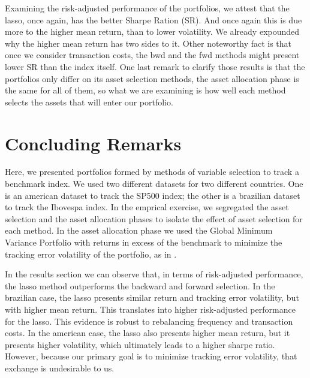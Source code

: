 \documentclass[preprint, doubleblind, authoryear,10pt]{elsarticle}
\begin{document}
Examining the risk-adjusted performance of the portfolios, we attest that the lasso, once again, has the better Sharpe Ration (SR).
And once again this is due more to the higher mean return, than to lower volatility.
We already expounded why the higher mean return has two sides to it.
Other noteworthy fact is that once we consider transaction costs, the bwd and the fwd methods might present lower SR than the index itself.
One last remark to clarify those results is that the portfolios only differ on its asset selection methods, the asset allocation phase is the same for all of them, so what we are examining is how well each method selects the assets that will enter our portfolio.

% 
% 
% 
% 
% 

\section{Concluding Remarks} \label{sec:conc}

Here, we presented portfolios formed by methods of variable selection to track a benchmark index.
We used two different datasets for two different countries.
One is an american dataset to track the SP500 index; the other is a brazilian dataset to track the Ibovespa index.
In the emprical exercise, we segregated the asset selection and the asset allocation phases to isolate the effect of asset selection for each method.
In the asset allocation phase we used the Global Minimum Variance Portfolio with returns in excess of the benchmark to minimize the tracking error volatility of the portfolio, as in \cite{liu-2009}.

In the results section we can observe that, in terms of risk-adjusted performance, the lasso method outperforms the backward and forward selection. 
In the brazilian case, the lasso presents similar return and tracking error volatility, but with higher mean return.
This translates into higher risk-adjusted performance for the lasso.
This evidence is robust to rebalancing frequency and transaction costs.
In the american case, the lasso also presents higher mean return, but it presents higher volatility, which ultimately leads to a higher sharpe ratio.
However, because our primary goal is to minimize tracking error volatility, that exchange is undesirable to us.
\end{document}
